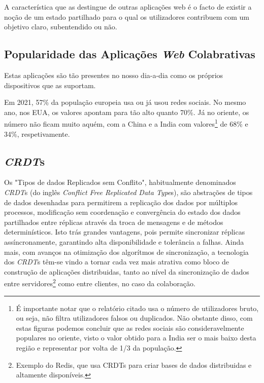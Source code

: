 \documentclass[runningheads]{llncs}
\begin{document}
        A característica que as destingue de outras aplicações web é o facto de existir a 
        noção de um estado partilhado para o qual os utilizadores contribuem com um objetivo 
        claro, subentendido ou não.

        \subsection{Popularidade das Aplicações {\itshape Web} Colabrativas}
        Estas aplicações são tão presentes no nosso dia-a-dia como os próprios dispositivos 
        que as suportam.

        Em 2021, 57\%\cite{eurostat-soc-media-usage} da população europeia usa ou já usou 
        redes sociais. No mesmo ano, nos EUA, os valores apontam para tão alto quanto 
        70\%\cite{usa-soc-media-usage}. Já no oriente, os número não ficam muito aquém, 
        com a China e a India com valores\footnote{É importante notar que o relatório citado 
        usa o número de utilizadores bruto, ou seja, não filtra utilizadores falsos ou 
        duplicados. Não obstante disso, com estas figuras podemos concluir que as redes 
        sociais são consideravelmente populares no oriente, visto o valor obtido para a 
        India ser o mais baixo desta região e representar por volta de 1/3 da população.} 
        de 68\% e 34\%, respetivamente\cite{digital2022}.


        \subsection{{\itshape CRDT}s}

        Os "Tipos de dados Replicados sem Conflito", habitualmente denominados 
        {\itshape CRDT}s (do inglês {\itshape Conflict Free Replicated Data Type}s), 
        são abstrações de tipos de dados desenhadas para permitirem a replicação dos 
        dados por múltiplos processos, modificação sem coordenação e convergência do 
        estado dos dados partilhados entre réplicas através da troca de mensagens e de 
        métodos determinísticos\cite{CRDTs}. Isto trás grandes vantagens, pois permite 
        sincronizar réplicas assíncronamente, garantindo alta disponibilidade e 
        tolerância a falhas. Ainda mais, com avanços na otimização dos algorítmos de 
        sincronização, a tecnologia dos {\itshape CRDT}s têm-se vindo a tornar cada 
        vez mais atrativa como bloco de construção de aplicações distribuidas, tanto 
        ao nível da sincronização de dados entre servidores\footnote{Exemplo do Redis, 
        que usa CRDTs para criar bases de dados distribuidas e altamente disponíveis.} 
        como entre clientes, no caso da colaboração.
\end{document}
